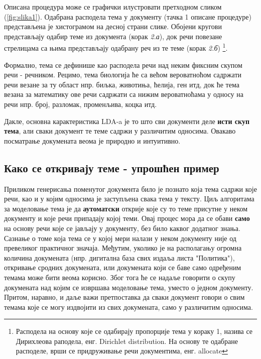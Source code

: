 Описана процедура може се графички илустровати претходном сликом (\ref{fig:slika1}). Одабрана расподела тема у документу (тачка 1 описане процедуре) представљена је хистограмом на десној страни слике. Обојени кругови представљају одабир теме из документа (корак \textit{2.а}), док речи повезане стрелицама са њима представљају одабрану реч из те теме (корак \textit{2.б}) \footnote{Расподела на основу које се одабирају пропорције тема у кораку 1, назива се Дирихлеова раподела, енг. Dirichlet distribution. На основу те одабране расподеле, врши се придруживање речи документима, енг. allocate}. 

Формално, тема се дефинише као расподела речи над неким фиксним скупом речи - речником. Рецимо, тема биологија ће са већом вероватноћом садржати речи везане за ту област нпр. биљка, животиња, ћелија, ген итд, док ће тема везана за математику ове речи садржати са нижим вероватноћама у односу на речи нпр. број, разломак, променљива, коцка итд.



Дакле, основна карактеристика LDA-a је то што сви документи деле \textbf{исти скуп тема}, али сваки документ те теме садржи у различитим односима. Овакаво посматрање докумената веома је природно и интуитивно. %

\subsection{Како се откривају теме - упрошћен пример}

Приликом генерисања поменутог документа било је познато која тема садржи које речи, као и у којим односима је заступљена свака тема у тексту. Циљ алгоритама за моделовање тема је да \textbf{аутоматски} открије  које су то теме присутне у неком документу и које речи припадају којој теми. Овај процес мора да се обави \textbf{само} на основу речи које се јављају у документу, без било каквог додатног знања.
Сазнање о томе која тема се у којој мери налази у неком документу није од превеликог практичног значаја. Међутим, уколико је на располагању огромна количина докумената (нпр. дигитална база свих издаља листа "Политика"), откривање сродних докумената, или докумената који се баве само одређеним темама може бити веома корисно. Због тога ће се надаље говорити о скупу докумената над којим се извршава моделовање тема, уместо о једном документу. Притом, наравно, и даље важи претпоставка да сваки документ говори о свим темама које се могу издвојити из свих докумената, само у различитим односима.

